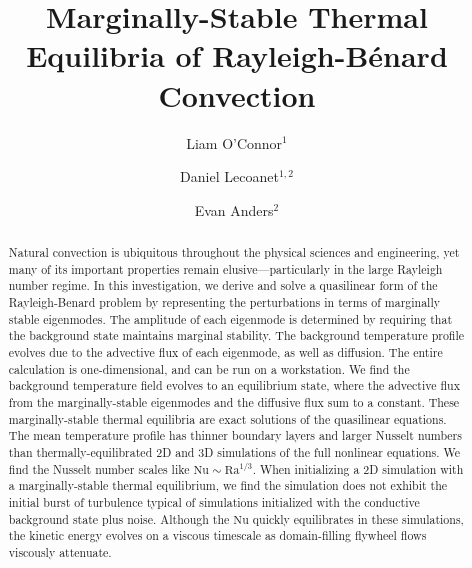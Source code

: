 \documentclass[reprint,amsmath,amssymb,aps]{revtex4-1}
\newcommand\Ra{\mathrm{Ra}}
\newcommand\Nu{\mathrm{Nu}}
\begin{document}
\title{Marginally-Stable Thermal Equilibria of Rayleigh-Bénard Convection}

\author{Liam O'Connor$^1$}
\author{Daniel Lecoanet$^{1, 2}$}
\author{Evan Anders$^2$}

\begin{abstract}
    Natural convection is ubiquitous throughout the physical sciences and engineering, yet many of its important properties remain elusive---particularly in the large Rayleigh number regime.
    In this investigation, we derive and solve a quasilinear form of the Rayleigh-Benard problem by representing the perturbations in terms of marginally stable eigenmodes.
    The amplitude of each eigenmode is determined by requiring that the background state maintains marginal stability.
    The background temperature profile evolves due to the advective flux of each eigenmode, as well as diffusion.
    The entire calculation is one-dimensional, and can be run on a workstation.
    We find the background temperature field evolves to an equilibrium state, where the advective flux from the marginally-stable eigenmodes and the diffusive flux sum to a constant.
    These marginally-stable thermal equilibria are exact solutions of the quasilinear equations.
    The mean temperature profile has thinner boundary layers and larger Nusselt numbers than thermally-equilibrated 2D and 3D simulations of the full nonlinear equations.
    We find the Nusselt number scales like $\Nu \sim\Ra^{1/3}$.
    When initializing a 2D simulation with a marginally-stable thermal equilibrium, we find the simulation does not exhibit the initial burst of turbulence typical of simulations initialized with the conductive background state plus noise.
    Although the $\Nu$ quickly equilibrates in these simulations, the kinetic energy evolves on a viscous timescale as domain-filling flywheel flows viscously attenuate.
\end{abstract}

\maketitle
\end{document}
